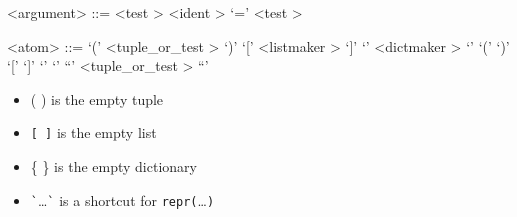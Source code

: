 \begin{grammar}
<argument> ::= <test \myref[testb]>
	\alt <ident \myref[identb]> `=' <test \myref[testb]>
\end{grammar}


\label{atomb}

\begin{grammar}
<atom> ::= `(' <tuple_or_test \myref[tuplezzzorzzztestb]> `)'
	\alt `[' <listmaker \myref[listmakerb]> `]'
	\alt `{' <dictmaker \myref[dictmakerb]> `}'
	\alt `(' `)'
	\alt `[' `]'
	\alt `{' `}'
	\alt ``' <tuple_or_test \myref[tuplezzzorzzztestb]> ``'
\end{grammar}


\begin{itemize}
\item ( ) is the empty tuple
\item \verb|[ ]| is the empty list
\item \{ \} is the empty dictionary
\item \verb|`|\ldots\verb|`| is a shortcut for \verb|repr(|\ldots\verb|)|
\end{itemize}

